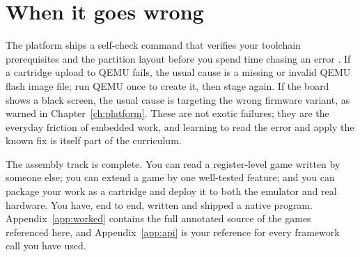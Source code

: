 \section{When it goes wrong}

The platform ships a self-check command that verifies your toolchain
prerequisites and the partition layout before you spend time chasing an error
\citep{prg32repo}. If a cartridge upload to QEMU fails, the usual cause is a
missing or invalid QEMU flash image file; run QEMU once to create it, then stage
again. If the board shows a black screen, the usual cause is targeting the
wrong firmware variant, as warned in Chapter~\ref{ch:platform}. These are not
exotic failures; they are the everyday friction of embedded work, and learning
to read the error and apply the known fix is itself part of the curriculum.

\begin{prgcheck}
The assembly track is complete. You can read a register-level game written by
someone else; you can extend a game by one well-tested feature; and you can
package your work as a cartridge and deploy it to both the emulator and real
hardware. You have, end to end, written and shipped a native \riscv program.
Appendix~\ref{app:worked} contains the full annotated source of the games
referenced here, and Appendix~\ref{app:api} is your reference for every framework
call you have used.
\end{prgcheck}
